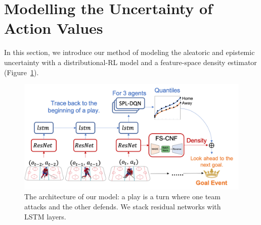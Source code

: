 \documentclass{article}
\begin{document}
\section{Modelling the Uncertainty of Action Values }\label{Sec:action-value-function}

In this section, we introduce our method of modeling the aleatoric and epistemic uncertainty with a distributional-RL model and a feature-space density estimator (Figure~\ref{fig:model-architecture}).

\begin{figure}[htbp]
    \vspace{-0.1in}
    \hspace{-0.1in}\includegraphics[scale=0.4]{figures/ice-hockey-net.png}
    \vspace{-0.3in}
    \caption{The architecture of our model: a play is a turn where one team attacks and the other defends. We stack residual networks with LSTM layers.
    }
    \label{fig:model-architecture}
    \vspace{-0.2in}
\end{figure}

\end{document}

